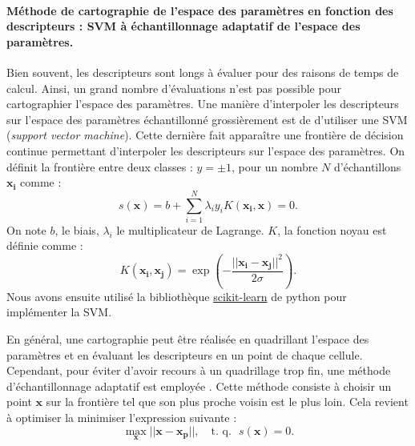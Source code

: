 \documentclass[french, twocolumn]{article}
\begin{document}
\vspace{3cm}

\paragraph{Méthode de cartographie de l'espace des paramètres en fonction des descripteurs : SVM à échantillonnage adaptatif de l'espace des paramètres.}

Bien souvent, les descripteurs sont longs à évaluer pour des raisons de temps de calcul. Ainsi, un grand nombre d'évaluations n'est pas possible pour cartographier l'espace des paramètres. Une manière d'interpoler les descripteurs sur l'espace des paramètres échantillonné grossièrement est de d'utiliser une SVM (\textit{support vector machine}). Cette dernière fait apparaître une frontière de décision continue permettant d'interpoler les descripteurs sur l'espace des paramètres. %
On définit la frontière entre deux classes : $y = \pm1$, pour un nombre $N$ d'échantillons $\mathbf{x_i}$ comme : 
\begin{equation}
    s(\mathbf{x}) = b + \sum_{i=1}^{N}\lambda_iy_iK(\mathbf{x_i},\mathbf{x}) = 0. 
\end{equation}
On note $b$, le biais, $\lambda_i$ le multiplicateur de Lagrange. 
$K$, la fonction noyau est définie comme : 
\begin{equation*}
    K(\mathbf{x_i},\mathbf{x_j}) = \exp\left(-\frac{||\mathbf{x_i}-\mathbf{x_j}||^2}{2\sigma}\right).
\end{equation*}
Nous avons ensuite utilisé la bibliothèque \href{https://scikit-learn.org/}{scikit-learn} de python pour implémenter la SVM. 

En général, une cartographie peut être réalisée en quadrillant l'espace des paramètres et en évaluant les descripteurs en un point de chaque cellule. Cependant, pour éviter d'avoir recours à un quadrillage trop fin, une méthode d'échantillonnage adaptatif est employée \cite{missoum_explicit_2014}\cite{basudhar2008adaptive}. Cette méthode consiste à choisir un point $\mathbf{x}$ sur la frontière tel que son plus proche voisin est le plus loin. Cela revient à optimiser la minimiser l'expression suivante : 
\begin{equation*}
     \max_{\mathbf{x}} || \mathbf{x}-\mathbf{x_p}||, \quad
      \text{t. q.} ~~~s(\mathbf{x}) = 0 . 
\end{equation*}
\end{document}

